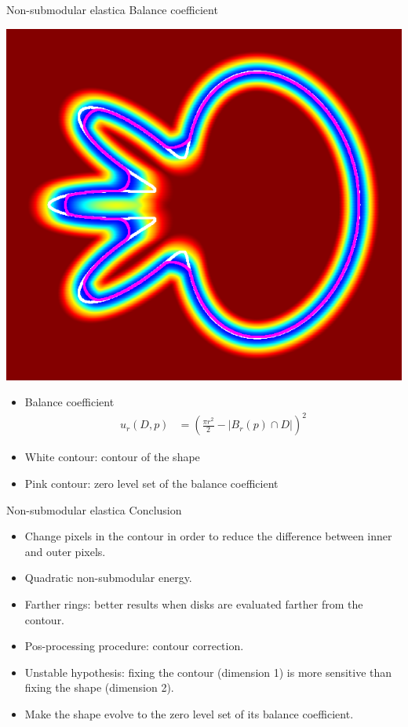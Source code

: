 \begin{frame}
{Non-submodular elastica}
{Balance coefficient}
\begin{minipage}{0.5\textwidth}
\center
\includegraphics[scale=0.2]{figures/non-submodular-elastica/balance-coefficient-zero-level-set.png}
\end{minipage}
\begin{minipage}{0.49\textwidth}
\footnotesize
\begin{itemize}
\item{Balance coefficient}
\begin{align*}
u_r(D,p) &= \left( \frac{\pi r^2}{2} - |B_r(p) \cap D| \right)^2
\end{align*}
\item{White contour: contour of the shape}
\item{Pink contour: zero level set of the balance coefficient}
\end{itemize}
\end{minipage}
\end{frame}

\begin{frame}
{Non-submodular elastica}
{Conclusion}

\begin{itemize}
\item{Change pixels in the contour in order to reduce the difference between inner and outer pixels.}
\item{Quadratic non-submodular energy.}
\pause
\item{Farther rings: better results when disks are evaluated farther from the contour. }
\pause
\item{Pos-processing procedure: contour correction. }
\pause
\item{Unstable hypothesis: fixing the contour (dimension 1) is more sensitive than fixing the shape (dimension 2).}
\item{Make the shape evolve to the zero level set of its balance coefficient.}
\end{itemize}
\end{frame}


